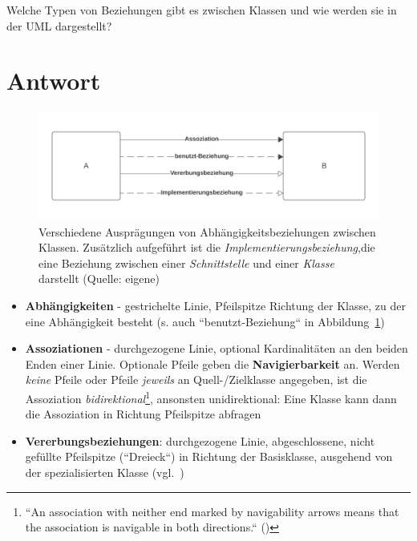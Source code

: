 Welche Typen von Beziehungen gibt es zwischen Klassen und wie werden sie in der UML dargestellt?


\section*{Antwort}

\begin{figure}
    \centering
    \includegraphics[scale=0.4]{chapters/aufgabe 1/img/umldependencies}
    \caption{Verschiedene Ausprägungen von Abhängigkeitsbeziehungen zwischen Klassen.
    Zusätzlich aufgeführt ist die \textit{Implementierungsbeziehung},die eine Beziehung zwischen einer \textit{Schnittstelle} und einer \textit{Klasse} darstellt (Quelle: eigene)}
    \label{fig:umldependencies}
\end{figure}

\begin{itemize}
    \item \textbf{Abhängigkeiten} - gestrichelte Linie, Pfeilspitze Richtung der Klasse, zu der eine Abhängigkeit besteht (s. auch ``benutzt-Beziehung`` in Abbildung~\ref{fig:umldependencies})
    \item \textbf{Assoziationen} - durchgezogene Linie, optional Kardinalitäten an den beiden Enden einer Linie.
    Optionale Pfeile geben die \textbf{Navigierbarkeit} an.
    Werden \textit{keine} Pfeile oder Pfeile \textit{jeweils} an Quell-/Zielklasse angegeben, ist die Assoziation \textit{bidirektional}\footnote{
    ``An association with neither end marked by navigability arrows means that the association is navigable in both
    directions.`` (\cite[18]{UML17})
    }, ansonsten unidirektional: Eine Klasse kann dann die Assoziation in Richtung Pfeilspitze abfragen
    \item \textbf{Vererbungsbeziehungen}: durchgezogene Linie, abgeschlossene, nicht gefüllte Pfeilspitze (``Dreieck``) in Richtung der Basisklasse, ausgehend von der spezialisierten Klasse (vgl.~\cite[52]{Bal05})
\end{itemize}